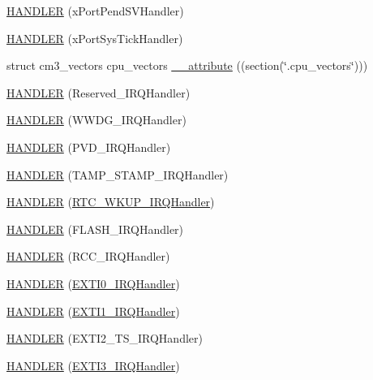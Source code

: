 \begin{DoxyCompactItemize}
\item 
\hyperlink{group___p_i_o_s_ga34841d66016106a71850a3c0efb0cbe7}{\-H\-A\-N\-D\-L\-E\-R} (x\-Port\-Pend\-S\-V\-Handler)
\item 
\hyperlink{group___p_i_o_s_ga3475219dea921ff367d4230f32172c25}{\-H\-A\-N\-D\-L\-E\-R} (x\-Port\-Sys\-Tick\-Handler)
\item 
struct cm3\-\_\-vectors cpu\-\_\-vectors \hyperlink{group___p_i_o_s_gaa3091d7ad2e376e149c455e647ad1f03}{\-\_\-\-\_\-attribute} ((section(\char`\"{}.cpu\-\_\-vectors\char`\"{})))
\item 
\hyperlink{group___p_i_o_s_ga2b6188c113332aeef4dfae90570b2a7c}{\-H\-A\-N\-D\-L\-E\-R} (\-Reserved\-\_\-\-I\-R\-Q\-Handler)
\item 
\hyperlink{group___p_i_o_s_gacc51fb846ad8dc05370ab051b0307eff}{\-H\-A\-N\-D\-L\-E\-R} (\-W\-W\-D\-G\-\_\-\-I\-R\-Q\-Handler)
\item 
\hyperlink{group___p_i_o_s_gacaf5a0d71233fe05229985176913af99}{\-H\-A\-N\-D\-L\-E\-R} (\-P\-V\-D\-\_\-\-I\-R\-Q\-Handler)
\item 
\hyperlink{group___p_i_o_s_ga24e33b33d441bd37d1127c6d8b43af02}{\-H\-A\-N\-D\-L\-E\-R} (\-T\-A\-M\-P\-\_\-\-S\-T\-A\-M\-P\-\_\-\-I\-R\-Q\-Handler)
\item 
\hyperlink{group___p_i_o_s_ga6c0711ebc5e0b1aaf3e7c7555be644b0}{\-H\-A\-N\-D\-L\-E\-R} (\hyperlink{group___sparky_ga7e78266985c97f3b7e8a9f91893657d1}{\-R\-T\-C\-\_\-\-W\-K\-U\-P\-\_\-\-I\-R\-Q\-Handler})
\item 
\hyperlink{group___p_i_o_s_gad2d12e5da34f9831f5fb626f4d6f9258}{\-H\-A\-N\-D\-L\-E\-R} (\-F\-L\-A\-S\-H\-\_\-\-I\-R\-Q\-Handler)
\item 
\hyperlink{group___p_i_o_s_gaa39ba7a7b9c4858c671e0e0811fbdf15}{\-H\-A\-N\-D\-L\-E\-R} (\-R\-C\-C\-\_\-\-I\-R\-Q\-Handler)
\item 
\hyperlink{group___p_i_o_s_ga4d34c7117246e20017f92377a86ef1d8}{\-H\-A\-N\-D\-L\-E\-R} (\hyperlink{group___p_i_o_s___e_x_t_i_ga17e9789a29a87d2df54f12b94dd1a0b6}{\-E\-X\-T\-I0\-\_\-\-I\-R\-Q\-Handler})
\item 
\hyperlink{group___p_i_o_s_ga45e5b700a5acc59f46c85542ef3ced58}{\-H\-A\-N\-D\-L\-E\-R} (\hyperlink{group___p_i_o_s___e_x_t_i_ga49cfdd46eb8d0ef3e1987514aa9343dc}{\-E\-X\-T\-I1\-\_\-\-I\-R\-Q\-Handler})
\item 
\hyperlink{group___p_i_o_s_ga0447579d55e271d7a793046ae6eca6e4}{\-H\-A\-N\-D\-L\-E\-R} (\-E\-X\-T\-I2\-\_\-\-T\-S\-\_\-\-I\-R\-Q\-Handler)
\item 
\hyperlink{group___p_i_o_s_gaad3527eb1b913871844c4e19b1208781}{\-H\-A\-N\-D\-L\-E\-R} (\hyperlink{group___p_i_o_s___e_x_t_i_ga30c045de96d18ec9c67a7b9e4350920f}{\-E\-X\-T\-I3\-\_\-\-I\-R\-Q\-Handler})

\end{DoxyCompactItemize}
